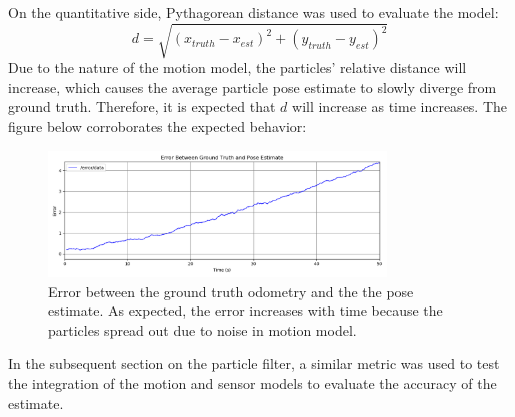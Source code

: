 \documentclass{article}
\begin{document}
On the quantitative side, Pythagorean distance was used to evaluate the model: 
\begin{equation}
d = \sqrt{(x_{truth}-x_{est})^2+(y_{truth}-y_{est})^2}
\end{equation}
Due to the nature of the motion model, the particles' relative distance will increase, which causes the average particle pose estimate to slowly diverge from ground truth. Therefore, it is expected that $d$ will increase as time increases. The figure below corroborates the expected behavior:

\begin{figure}[H]
    \centering
    \includegraphics[width=0.8\textwidth]{error_motion_model.png}
    \caption{Error between the ground truth odometry and the the pose estimate. As expected, the error increases with time because the particles spread out due to noise in motion model. }
    \label{fig:motion_model_err}
\end{figure}

In the subsequent section on the particle filter, a similar metric was used to test the integration of the motion and sensor models to evaluate the accuracy of the estimate.
\end{document}
